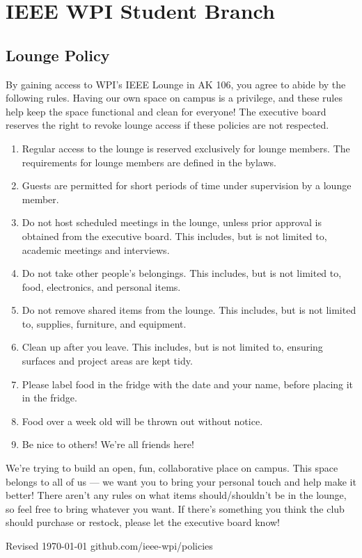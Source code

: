 \documentclass{report}
\begin{document}
\section*{IEEE WPI Student Branch}
\subsection*{Lounge Policy}
By gaining access to WPI's IEEE Lounge in AK 106, you agree to abide by the following rules. Having our own space on campus is a privilege, and these rules help keep the space functional and clean for everyone! The executive board reserves the right to revoke lounge access if these policies are not respected.

\begin{enumerate}
    \item{Regular access to the lounge is reserved exclusively for lounge members. The requirements for lounge members are defined in the bylaws.}
    \item{Guests are permitted for short periods of time under supervision by a lounge member.}
    \item{Do not host scheduled meetings in the lounge, unless prior approval is obtained from the executive board. This includes, but is not limited to, academic meetings and interviews.}
    \item{Do not take other people's belongings. This includes, but is not limited to, food, electronics, and personal items.}
    \item{Do not remove shared items from the lounge. This includes, but is not limited to, supplies, furniture, and equipment.}
    \item{Clean up after you leave. This includes, but is not limited to, ensuring surfaces and project areas are kept tidy.}
    \item{Please label food in the fridge with the date and your name, before placing it in the fridge.}
    \item{Food over a week old will be thrown out without notice.}
    \item{Be nice to others! We're all friends here! \Large\smiley{}}
\end{enumerate}

\noindent We're trying to build an open, fun, collaborative place on campus. This space belongs to all of us — we want you to bring your personal touch and help make it better! There aren't any rules on what items should/shouldn't be in the lounge, so feel free to bring whatever you want. If there's something you think the club should purchase or restock, please let the executive board know!

\vspace{\fill}
\noindent \normalsize{Revised \today}
\hspace{\fill}
github.com/ieee-wpi/policies
\end{document}
